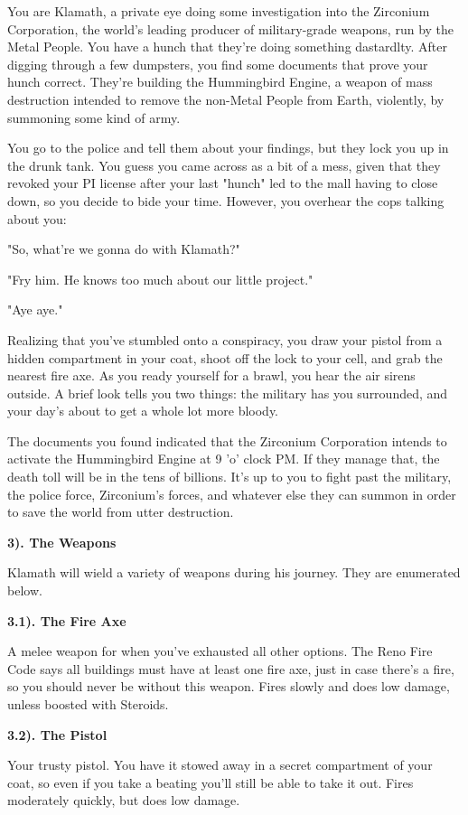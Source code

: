 \documentclass[12pt]{article}
\begin{document}
\begin{flushleft}
You are Klamath, a private eye doing some investigation into the Zirconium Corporation, the world's leading producer of military-grade weapons, run by the Metal People. You have a hunch that they're doing something dastardlty. After digging through a few dumpsters, you find some documents that prove your hunch correct. They're building the Hummingbird Engine, a weapon of mass destruction intended to remove the non-Metal People from Earth, violently, by summoning some kind of army.

You go to the police and tell them about your findings, but they lock you up in the drunk tank. You guess you came across as a bit of a mess, given that they revoked your PI license after your last "hunch" led to the mall having to close down, so you decide to bide your time. However, you overhear the cops talking about you:

"So, what're we gonna do with Klamath?"

"Fry him. He knows too much about our little project."

"Aye aye."

Realizing that you've stumbled onto a conspiracy, you draw your pistol from a hidden compartment in your coat, shoot off the lock to your cell, and grab the nearest fire axe. As you ready yourself for a brawl, you hear the air sirens outside. A brief look tells you two things: the military has you surrounded, and your day's about to get a whole lot more bloody.

The documents you found indicated that the Zirconium Corporation intends to activate the Hummingbird Engine at 9 'o' clock PM. If they manage that, the death toll will be in the tens of billions. It's up to you to fight past the military, the police force, Zirconium's forces, and whatever else they can summon in order to save the world from utter destruction.

\textbf{3). The Weapons}

Klamath will wield a variety of weapons during his journey. They are enumerated below.

\textbf{3.1). The Fire Axe}

A melee weapon for when you've exhausted all other options. The Reno Fire Code says all buildings must have at least one fire axe, just in case there's a fire, so you should never be without this weapon. Fires slowly and does low damage, unless boosted with Steroids.

\textbf{3.2). The Pistol}

Your trusty pistol. You have it stowed away in a secret compartment of your coat, so even if you take a beating you'll still be able to take it out. Fires moderately quickly, but does low damage.


\end{flushleft}
\end{document}
